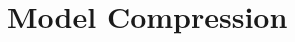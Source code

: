 \setcounter{chapter}{17}

\hypertarget{model-compression}{%
\chapter{Model Compression}\label{model-compression}}
